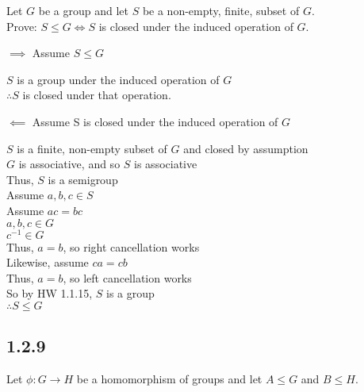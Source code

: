 \documentclass[letterpaper,12pt,fleqn]{article}
\newcommand{\p}{\phi}
\begin{document}
Let $G$ be a group and let $S$ be a non-empty, finite, subset of $G$. \\
Prove: $S\le G\iff S$ is closed under the induced operation of $G$.

\begin{description}
\item $\implies$ Assume $S\le G$

  $S$ is a group under the induced operation of $G$ \\
  $\therefore S$ is closed under that operation.

\item $\impliedby$ Assume S is closed under the induced operation of $G$

  $S$ is a finite, non-empty subset of $G$ and closed by assumption \\
  $G$ is associative, and so $S$ is associative \\
  Thus, $S$ is a semigroup \\
  Assume $a,b,c\in S$ \\
  Assume $ac=bc$ \\
  $a,b,c\in G$ \\
  $c^{-1}\in G$ \\
  Thus, $a=b$, so right cancellation works \\
  Likewise, assume $ca=cb$ \\
  Thus, $a=b$, so left cancellation works \\
  So by HW 1.1.15, $S$ is a group \\
  $\therefore S\le G$
\end{description}

\subsection*{1.2.9}

Let $\p:G\to H$ be a homomorphism of groups and let $A\le G$ and $B\le H$.
\end{document}

